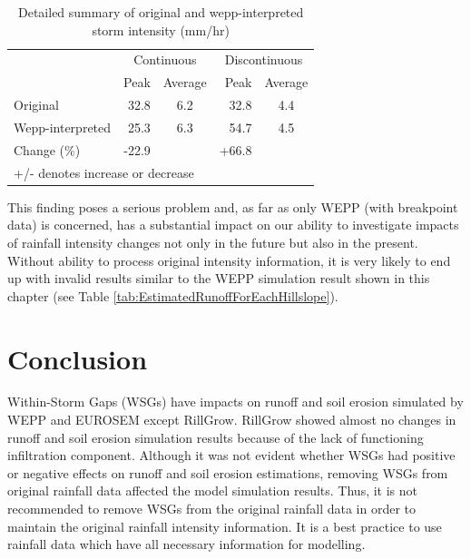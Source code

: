 \begin{table}[htbp]
  \caption{Detailed summary of original and wepp-interpreted storm intensity
(mm/hr)}
\begin{tabular}{lrcrc}
  \toprule
 & \multicolumn{2}{c}{Continuous} & \multicolumn{2}{c}{Discontinuous} \\
  \cmidrule(r){2-3} \cmidrule(l){4-5}
 & Peak & Average & Peak & Average \\ \midrule
Original & 32.8 & 6.2  & 32.8 & 4.4 \\
Wepp-interpreted & 25.3 & 6.3 &  54.7 & 4.5 \\
Change (\%) & -22.9 &  & +66.8 &  \\
  \bottomrule
\multicolumn{5}{p{8cm}}{+/- denotes increase or decrease}
\end{tabular}
\label{tab:summaryofweppchangedstormdetails}
\end{table}

This finding poses a serious problem and, as far as only WEPP (with breakpoint
data) is concerned, has a substantial impact on our ability to investigate
impacts of rainfall intensity changes not only in the future but also in the
present. Without ability to process original intensity information, it is very
likely to end up with invalid results similar to the WEPP simulation result
shown in this chapter (see Table \ref{tab:EstimatedRunoffForEachHillslope}).

\section{Conclusion}
\label{sec:InterStormPeriodsWithinAStormConclusion}

Within-Storm Gaps (WSGs) have impacts on runoff and soil erosion simulated by
WEPP and EUROSEM except RillGrow. RillGrow showed almost no changes in
runoff and soil erosion simulation results because of the lack of functioning
infiltration component. Although it was not evident whether WSGs had positive
or negative effects on runoff and soil erosion estimations, removing WSGs from
original rainfall data affected the model simulation results. Thus, it is not
recommended to remove WSGs from the original rainfall data in order to
maintain the original rainfall intensity information. It is a best practice to
use rainfall data which have all necessary information for modelling.

